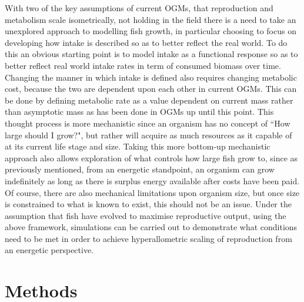 \documentclass[a4paper, 11pt, hidelinks]{article} %
\begin{document}
	With two of the key assumptions of current OGMs, that reproduction and metabolism scale isometrically, not holding in the field \parencite{Barneche2018, Pawar2012, Peters1983} there is a need to take an unexplored approach to modelling fish growth, in particular choosing to focus on developing how intake is described so as to better reflect the real world.  To do this an obvious starting point is to model intake as a functional response \parencite{Holling1959} so as to better reflect real world intake rates in term of consumed biomass over time.  Changing the manner in which intake is defined also requires changing metabolic cost, because the two are dependent upon each other in current OGMs.  This can be done by defining metabolic rate as a value dependent on current mass rather than asymptotic mass as has been done in OGMs up until this point.  This thought process is more mechanistic since an organism has no concept of ``How large should I grow?", but rather will acquire as much resources as it capable of at its current life stage and size.  Taking this more bottom-up mechanistic approach also allows exploration of what controls how large fish grow to, since as previously mentioned, from an energetic standpoint, an organism can grow indefinitely as long as there is surplus energy available after costs have been paid.  Of course, there are also mechanical limitations upon organism size, but once  size is constrained to what is known to exist, this should not be an issue.  
	Under the assumption that fish have evolved to maximise reproductive output, using the above framework, simulations can be carried out to demonstrate what conditions need to be met in order to achieve hyperallometric scaling of reproduction from an energetic perspective.
	

% 
	\nolinenumbers
	
\section{Methods}
	\linenumbers
	
\end{document}
